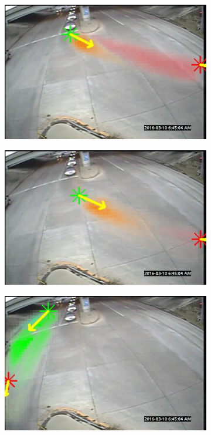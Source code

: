 \begin{figure}
    \centering
        \begin{subfigure}{0.32\linewidth}
            \includegraphics[width=\linewidth]{./img/scene_learning/res/middle/middle-1.jpg}
        \end{subfigure}
        \begin{subfigure}{0.32\linewidth}
            \includegraphics[width=\linewidth]{./img/scene_learning/res/middle/middle-3.jpg}
        \end{subfigure}
        \begin{subfigure}{0.32\linewidth}
            \includegraphics[width=\linewidth]{./img/scene_learning/res/middle/middle-0.jpg}

\end{subfigure}
\end{figure}
